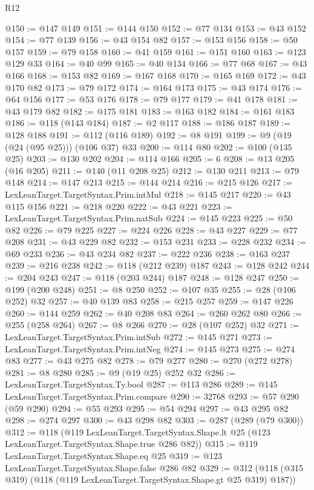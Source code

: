 \begin{lexlean}{R12}
\begin{coremodule}
@150 := @147 @149
@151 := @144 @150
@152 := @77 @134
@153 := @43 @152
@154 := @77 @139
@156 := @43 @154 @82
@157 := @153 @156
@158 := @50 @157
@159 := @79 @158
@160 := @41 @159
@161 := @151 @160
@163 := @123 @129 @33
@164 := @40 @99
@165 := @40 @134
@166 := @77 @68
@167 := @43 @166
@168 := @153 @82
@169 := @167 @168
@170 := @165 @169
@172 := @43 @170 @82
@173 := @79 @172
@174 := @164 @173
@175 := @43 @174
@176 := @64 @156
@177 := @53 @176
@178 := @79 @177
@179 := @41 @178
@181 := @43 @179 @82
@182 := @175 @181
@183 := @163 @182
@184 := @161 @183
@186 := @118 (@143 @184)
@187 := @2 @117
@188 := @186 @187
@189 := @128 @188
@191 := @112 (@116 @189)
@192 := @8 @191
@199 := @9 (@19 (@24 (@95 @25))) (@106 @37) @33
@200 := @114 @80
@202 := @100 (@135 @25)
@203 := @130 @202
@204 := @114 @166
@205 := 6
@208 := @13 @205 (@16 @205)
@211 := @140 (@11 @208 @25)
@212 := @130 @211
@213 := @79 @148
@214 := @147 @213
@215 := @144 @214
@216 := @215 @126
@217 := LexLeanTarget.TargetSyntax.Prim.intMul
@218 := @145 @217
@220 := @43 @115 @156
@221 := @218 @220
@222 := @43 @221
@223 := LexLeanTarget.TargetSyntax.Prim.natSub
@224 := @145 @223
@225 := @50 @82
@226 := @79 @225
@227 := @224 @226
@228 := @43 @227
@229 := @77 @208
@231 := @43 @229 @82
@232 := @153 @231
@233 := @228 @232
@234 := @69 @233
@236 := @43 @234 @82
@237 := @222 @236
@238 := @163 @237
@239 := @216 @238
@242 := @118 (@212 @239) @187
@243 := @128 @242
@244 := @204 @243
@247 := @118 (@203 @244) @187
@248 := @128 @247
@250 := @199 (@200 @248)
@251 := @8 @250
@252 := @107 @35
@255 := @28 (@106 @252) @32
@257 := @40 @139 @83
@258 := @215 @257
@259 := @147 @226
@260 := @144 @259
@262 := @40 @208 @83
@264 := @260 @262 @80
@266 := @255 (@258 @264)
@267 := @8 @266
@270 := @28 (@107 @252) @32
@271 := LexLeanTarget.TargetSyntax.Prim.intSub
@272 := @145 @271
@273 := LexLeanTarget.TargetSyntax.Prim.intNeg
@274 := @145 @273
@275 := @274 @83
@277 := @43 @275 @82
@278 := @79 @277
@280 := @270 (@272 @278)
@281 := @8 @280
@285 := @9 (@19 @25) @252 @32
@286 := LexLeanTarget.TargetSyntax.Ty.bool
@287 := @113 @286
@289 := @145 LexLeanTarget.TargetSyntax.Prim.compare
@290 := 32768
@293 := @57 @290 (@59 @290)
@294 := @55 @293
@295 := @54 @294
@297 := @43 @295 @82
@298 := @274 @297
@300 := @43 @298 @82
@303 := @287 (@289 (@79 @300))
@312 := @118
    (@119
      LexLeanTarget.TargetSyntax.Shape.lt
      @25
      (@123 LexLeanTarget.TargetSyntax.Shape.true @286 @82))
@315 := @119 LexLeanTarget.TargetSyntax.Shape.eq @25
@319 := @123 LexLeanTarget.TargetSyntax.Shape.false @286 @82
@329 := @312 (@118 (@315 @319) (@118 (@119 LexLeanTarget.TargetSyntax.Shape.gt @25 @319) @187))

\end{coremodule}
\end{lexlean}
